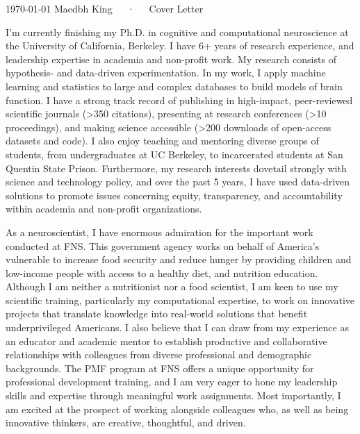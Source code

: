 \documentclass[9pt, a4paper]{maedbh-cv}
\begin{document}
\makecvheader[R]

\makecvfooter
  {\today}
  {Maedbh King~~~·~~~Cover Letter}
  {}
  
\makelettertitle

\begin{cvletter}

I'm currently finishing my Ph.D. in cognitive and computational neuroscience at the University of California, Berkeley. I have 6+ years of research experience, and leadership expertise in academia and non-profit work. My research consists of hypothesis- and data-driven experimentation. In my work, I apply machine learning and statistics to large and complex databases to build models of brain function. I have a strong track record of publishing in high-impact, peer-reviewed scientific journals (>350 citations), presenting at research conferences (>10 proceedings), and making science accessible (>200 downloads of open-access datasets and code). I also enjoy teaching and mentoring diverse groups of students, from undergraduates at UC Berkeley, to incarcerated students at San Quentin State Prison. Furthermore, my research interests dovetail strongly with science and technology policy, and over the past 5 years, I have used data-driven solutions to promote issues concerning equity, transparency, and accountability within academia and non-profit organizations. 

As a neuroscientist, I have enormous admiration for the important work conducted at FNS. This government agency works on behalf of America's vulnerable to increase food security and reduce hunger by providing children and low-income people with access to a healthy diet, and nutrition education. Although I am neither a nutritionist nor a food scientist, I am keen to use my scientific training, particularly my computational expertise, to work on innovative projects that translate knowledge into real-world solutions that benefit underprivileged Americans. I also believe that I can draw from my experience as an educator and academic mentor to establish productive and collaborative relationships with colleagues from diverse professional and demographic backgrounds. The PMF program at FNS offers a unique opportunity for professional development training, and I am very eager to hone my leadership skills and expertise through meaningful work assignments. Most importantly, I am excited at the prospect of working alongside colleagues who, as well as being innovative thinkers, are creative, thoughtful, and driven. 


\end{cvletter}
\end{document}
